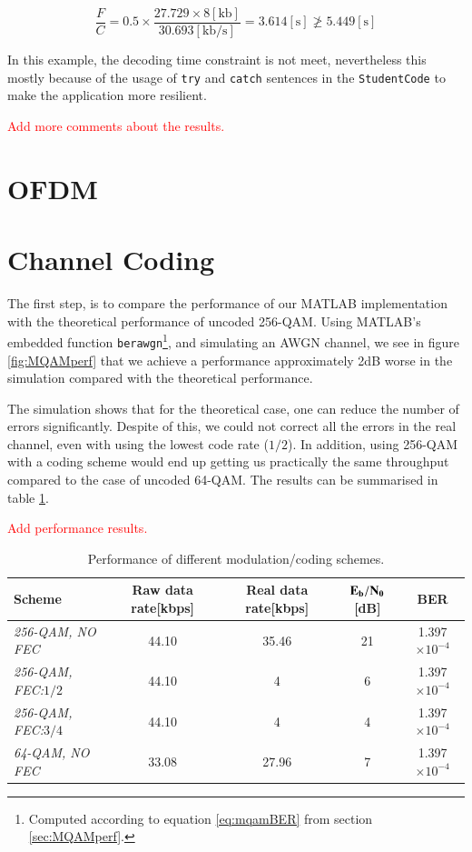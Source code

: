 \documentclass[12pt,a4paper,openright]{report}
\begin{document}
\[
\frac{F}{C} = 0.5 \times \frac{{27.729 \times 8 \left[ {{\text{kb}}} \right]}}{{30.693\left[ {{\text{kb/s}}} \right]}} = 3.614\left[ \text{s} \right] \ngeq 5.449\left[ \text{s} \right]
\]

In this example, the decoding time constraint is not meet, nevertheless this mostly because of the usage of \texttt{try} and \texttt{catch} sentences in the \texttt{StudentCode} to make the application more resilient.  

\textcolor{red}{Add more comments about the results.}


\section{OFDM}

\section{Channel Coding}

The first step, is to compare the performance of our MATLAB implementation with the theoretical performance of uncoded 256-QAM. Using MATLAB's embedded function \texttt{berawgn}\footnote{Computed according to equation \ref{eq:mqamBER} from section \ref{sec:MQAMperf}.}, and simulating an AWGN channel, we see in figure \ref{fig:MQAMperf} that we achieve a performance approximately 2dB worse in the simulation compared with the theoretical performance.

The simulation shows that for the theoretical case, one can reduce the number of errors significantly. Despite of this, we could not correct all the errors in the real channel, even with using the lowest code rate ($1/2 $). In addition, using 256-QAM with a coding scheme would end up getting us practically the same throughput compared to the case of uncoded 64-QAM. The results can be summarised in table \ref{table:Rates}.


\textcolor{red}{Add performance results.}
\begin{table} [h]
\centering
\begin{tabular}{lcccc} 
\hline
\bf{Scheme} 				       & \bf{Raw data rate}\textnormal{[kbps]}    & \bf{Real data rate}\textnormal{[kbps]} & ${{\text{\bf E}}_{\text{\bf b}}}/{{\text{\bf N}}_{\text{\bf 0}}}$ [dB] &\bf{BER} \\
\hline
\emph{256-QAM, NO FEC}           & 44.10            & 35.46      & 21        & 1.397$\times 10^{-4}$      \\
\emph{256-QAM, FEC:$1/2$}        & 44.10            & 4          & 6       & 1.397$\times 10^{-4}$                      \\
\emph{256-QAM, FEC:$3/4$}        & 44.10            & 4          & 4      & 1.397$\times 10^{-4}$\\
\hline
\emph{64-QAM, NO FEC}            & 33.08           & 27.96       & 7     & 1.397$\times 10^{-4}$  \\
\hline
\end{tabular}
\caption[Performance of different modulation/coding schemes]{Performance of different modulation/coding schemes.}
\label{table:Rates}
\end{table}
\end{document}
